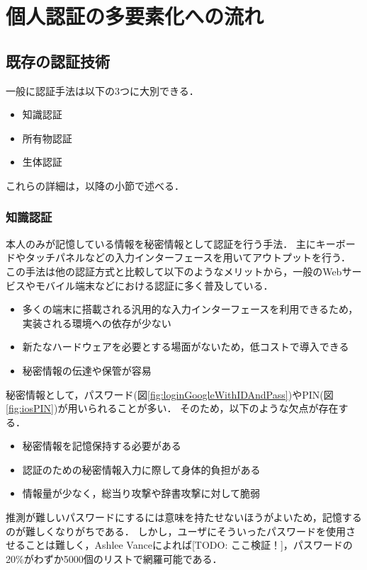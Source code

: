 \chapter{個人認証の多要素化への流れ}\label{chap:preparation}

\section{既存の認証技術}
一般に認証手法は以下の3つに大別できる．
\begin{itemize}
\item 知識認証
\item 所有物認証
\item 生体認証
\end{itemize}
これらの詳細は，以降の小節で述べる．

\subsection{知識認証}\label{subsec:knowledge}
本人のみが記憶している情報を秘密情報として認証を行う手法．
主にキーボードやタッチパネルなどの入力インターフェースを用いてアウトプットを行う．
この手法は他の認証方式と比較して以下のようなメリットから，一般のWebサービスやモバイル端末などにおける認証に多く普及している．
\begin{itemize}
\item 多くの端末に搭載される汎用的な入力インターフェースを利用できるため，実装される環境への依存が少ない
\item 新たなハードウェアを必要とする場面がないため，低コストで導入できる
\item 秘密情報の伝達や保管が容易
\end{itemize}
秘密情報として，パスワード(図\ref{fig:loginGoogleWithIDAndPass})やPIN(図\ref{fig:iosPIN})が用いられることが多い．
そのため，以下のような欠点が存在する．
\begin{itemize}
\item 秘密情報を記憶保持する必要がある
\item 認証のための秘密情報入力に際して身体的負担がある
\item 情報量が少なく，総当り攻撃や辞書攻撃に対して脆弱
\end{itemize}
推測が難しいパスワードにするには意味を持たせないほうがよいため，記憶するのが難しくなりがちである．
しかし，ユーザにそういったパスワードを使用させることは難しく，Ashlee Vance\cite{21password}によれば[TODO: ここ検証！]，パスワードの20\%がわずか5000個のリストで網羅可能である．

